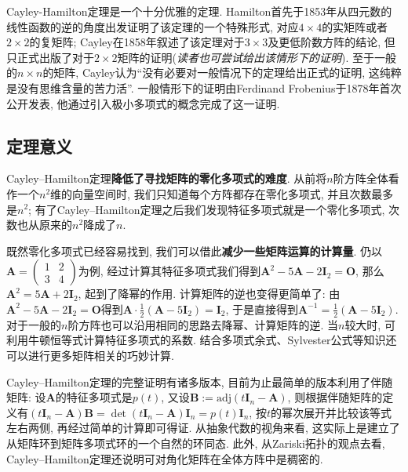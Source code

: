 \documentclass[main]{subfiles}
\newcommand{\dis}{\displaystyle}
\newcommand{\adj}{\mathrm{adj}}
\begin{document}
		Cayley-Hamilton定理是一个十分优雅的定理. Hamilton首先于1853年从四元数的线性函数的逆的角度出发证明了该定理的一个特殊形式, 对应$4\times 4$的实矩阵或者$2\times 2$的复矩阵; Cayley在1858年叙述了该定理对于$3\times 3$及更低阶数方阵的结论, 但只正式出版了对于$2\times 2$矩阵的证明(\textit{读者也可尝试给出该情形下的证明}). 至于一般的$n\times n$的矩阵, Cayley认为“没有必要对一般情况下的定理给出正式的证明, 这纯粹是没有思维含量的苦力活”. 一般情形下的证明由Ferdinand Frobenius于1878年首次公开发表, 他通过引入极小多项式的概念完成了这一证明.
		
	\subsection{定理意义}
		Cayley–Hamilton定理\textbf{降低了寻找矩阵的零化多项式的难度}. 从前将$n$阶方阵全体看作一个$n^{2}$维的向量空间时, 我们只知道每个方阵都存在零化多项式, 并且次数最多是$n^2$; 有了Cayley–Hamilton定理之后我们发现特征多项式就是一个零化多项式, 次数也从原来的$n^2$降成了$n$. 
	
		既然零化多项式已经容易找到, 我们可以借此\textbf{减少一些矩阵运算的计算量}. 仍以$\boldsymbol{A}=\begin{pmatrix}
			1 & 2 \\
			3 & 4
		\end{pmatrix}$为例, 经过计算其特征多项式我们得到$\boldsymbol{A}^2-5\boldsymbol{A}-2\boldsymbol{I}_2=\boldsymbol{O}$, 那么$\boldsymbol{A}^2=5\boldsymbol{A}+2\boldsymbol{I}_2$, 起到了降幂的作用. 计算矩阵的逆也变得更简单了: 由$\boldsymbol{A}^2-5\boldsymbol{A}-2\boldsymbol{I}_2=\boldsymbol{O}$得到$\dis\boldsymbol{A}\cdot\frac{1}{2}(\boldsymbol{A}-5\boldsymbol{I}_2)=\boldsymbol{I}_2$, 于是直接得到$\dis\boldsymbol{A}^{-1}=\frac{1}{2}(\boldsymbol{A}-5\boldsymbol{I}_2)$. 对于一般的$n$阶方阵也可以沿用相同的思路去降幂、计算矩阵的逆. 当$n$较大时, 可利用牛顿恒等式计算特征多项式的系数. 结合多项式余式、Sylvester公式等知识还可以进行更多矩阵相关的巧妙计算. 
		
		Cayley–Hamilton定理的完整证明有诸多版本, 目前为止最简单的版本利用了伴随矩阵: 设$\boldsymbol{A}$的特征多项式是$p(t)$, 又设$\boldsymbol{B}:=\adj(t\boldsymbol{I}_n-\boldsymbol{A})$, 则根据伴随矩阵的定义有$(t\boldsymbol{I}_n-\boldsymbol{A})\boldsymbol{B}=\det(t\boldsymbol{I}_n-\boldsymbol{A})\boldsymbol{I}_n=p(t)\boldsymbol{I}_n$, 按$t$的幂次展开并比较该等式左右两侧, 再经过简单的计算即可得证. 从抽象代数的视角来看, 这实际上是建立了从矩阵环到矩阵多项式环的一个自然的环同态. 此外, 从Zariski拓扑的观点去看, Cayley–Hamilton定理还说明可对角化矩阵在全体方阵中是稠密的.
\end{document}
